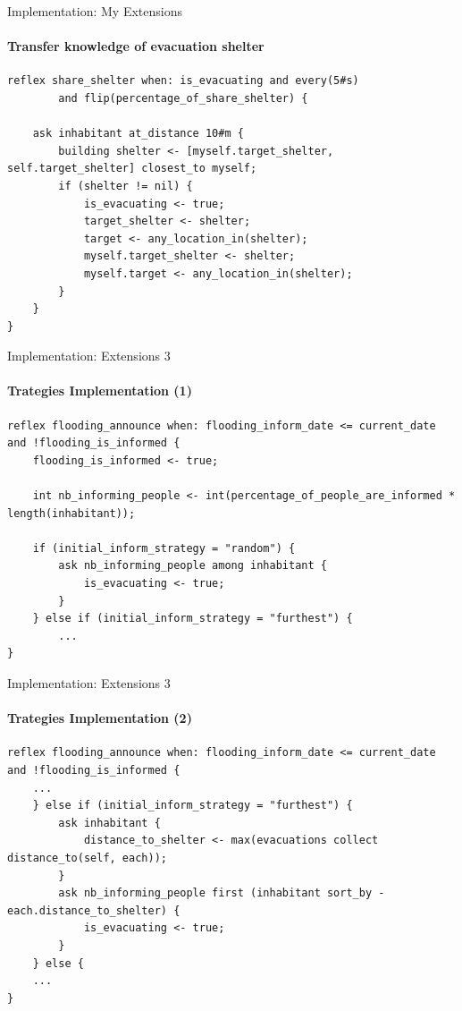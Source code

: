 \documentclass{beamer}
\begin{document}
\begin{frame}[fragile]{Implementation: My Extensions}
\framesubtitle{Transfer knowledge of evacuation shelter}
    
\begin{lstlisting}[style=GAML]
reflex share_shelter when: is_evacuating and every(5#s) 
        and flip(percentage_of_share_shelter) {

    ask inhabitant at_distance 10#m {
        building shelter <- [myself.target_shelter, self.target_shelter] closest_to myself;
        if (shelter != nil) {
            is_evacuating <- true;
            target_shelter <- shelter;
            target <- any_location_in(shelter);
            myself.target_shelter <- shelter;
            myself.target <- any_location_in(shelter);
        }
    }
}
\end{lstlisting}
    
\end{frame}

\begin{frame}[fragile]{Implementation: Extensions 3}
\framesubtitle{Trategies Implementation (1)}
    
\begin{lstlisting}[style=GAML]
reflex flooding_announce when: flooding_inform_date <= current_date and !flooding_is_informed {		
    flooding_is_informed <- true;
    
    int nb_informing_people <- int(percentage_of_people_are_informed * length(inhabitant));
    
    if (initial_inform_strategy = "random") {
        ask nb_informing_people among inhabitant {
            is_evacuating <- true;
        }
    } else if (initial_inform_strategy = "furthest") {
        ...
} 
\end{lstlisting}

\end{frame}

\begin{frame}[fragile]{Implementation: Extensions 3}
\framesubtitle{Trategies Implementation (2)}
    
\begin{lstlisting}[style=GAML]
reflex flooding_announce when: flooding_inform_date <= current_date and !flooding_is_informed {		
    ...
    } else if (initial_inform_strategy = "furthest") {
        ask inhabitant {
            distance_to_shelter <- max(evacuations collect distance_to(self, each));
        }
        ask nb_informing_people first (inhabitant sort_by -each.distance_to_shelter) {
            is_evacuating <- true;
        }
    } else {
    ...
} 
\end{lstlisting}

\end{frame}
\end{document}
